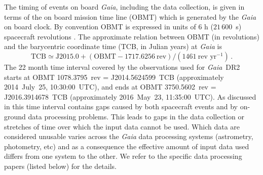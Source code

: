 \documentclass[longauth]{aa_gaia} %
\newcommand\gaia{\textit{Gaia}}
\newcommand\gdr[1]{\gaia~DR#1}
\begin{document}
The timing of events on board {\gaia}, including the data collection, is given in terms of the
on board mission time line (OBMT) which is generated by the {\gaia} on board clock. By convention
OBMT is expressed in units of 6 h ($21\,600$~s) spacecraft revolutions \citep{2016A&A...595A...1G}.
The approximate relation between OBMT (in revolutions) and the barycentric coordinate time (TCB, in
Julian years) at {\gaia} is
\begin{equation}
  \text{TCB} \simeq \text{J}2015.0 + (\text{OBMT} - 1717.6256~\text{rev})/(1461~\text{rev yr}^{-1})\,.
\end{equation}
The 22 month time interval covered by the observations used for \gdr{2} starts at OBMT
1078.3795~rev = J2014.5624599~TCB (approximately 2014~July~25, 10:30:00~UTC), and ends at OBMT
3750.5602~rev = J2016.3914678~TCB (approximately 2016~May~23, 11:35:00~UTC). As discussed in
\cite{2016A&A...595A...2G} this time interval contains gaps caused by both spacecraft events and by
on-ground data processing problems. This leads to gaps in the data collection or stretches of time
over which the input data cannot be used. Which data are considered unusable varies across the
{\gaia} data processing systems (astrometry, photometry, etc) and as a consequence the effective
amount of input data used differs from one system to the other. We refer to the specific data
processing papers (listed below) for the details.
\end{document}
